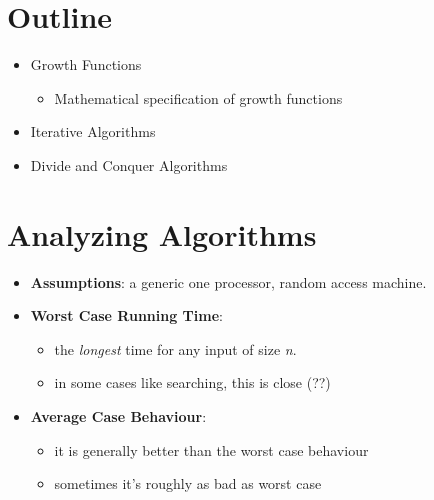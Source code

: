 \documentclass[11pt,a4paper]{report}
\begin{document}
		\section{Outline}
			\begin{itemize}
				\item Growth Functions
					\begin{itemize}
						\item Mathematical specification of growth functions
					\end{itemize}
				\item Iterative Algorithms
				\item Divide and Conquer Algorithms
			\end{itemize}

		\section{Analyzing Algorithms}
			\begin{itemize}
				
				\item \textbf{Assumptions}: a generic one processor, random access machine. 
				
				\item \textbf{Worst Case Running Time}: 
					
					\begin{itemize}				

						\item the \emph{longest} time for any input of size \emph{n}.

						\item in some cases like searching, this is close (??)

					\end{itemize}
					
				\item \textbf{Average Case Behaviour}:
					\begin{itemize}				
						\item it is generally better than the worst case behaviour
						\item sometimes it's roughly as bad as worst case
					\end{itemize}
			\end{itemize}
			
\end{document}
